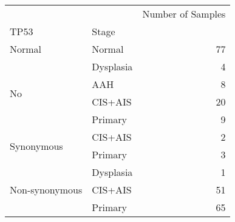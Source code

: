 \begin{tabular}{l|lr}
\toprule
               &         & Number of Samples \\
TP53 & Stage &                   \\
\midrule
Normal & Normal &                77 \\
\multirow{4}{*}{No} & Dysplasia &                 4 \\
               & AAH &                 8 \\
               & CIS+AIS &                20 \\
               & Primary &                 9 \\
\cline{1-3}
\multirow{2}{*}{Synonymous} & CIS+AIS &                 2 \\
               & Primary &                 3 \\
\cline{1-3}
\multirow{3}{*}{Non-synonymous} & Dysplasia &                 1 \\
               & CIS+AIS &                51 \\
               & Primary &                65 \\
\bottomrule
\end{tabular}
